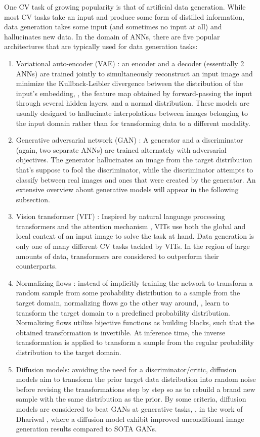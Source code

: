 One CV task of growing popularity is that of artificial data generation.
While most CV tasks take an input and produce some form of distilled information, data generation takes some input (and sometimes no input at all) and hallucinates new data.
In the domain of ANNs, there are five popular architectures that are typically used for data generation tasks:
\begin{enumerate}
    \item Variational auto-encoder (VAE) \cite{kingma2013auto}: an encoder and a decoder (essentially 2 ANNs) are trained jointly to simultaneously reconstruct an input image and minimize the Kullback-Leibler divergence \cite{csiszar1975divergence} between the distribution of the input's embedding, \ie, the feature map obtained by forward-passing the input through several hidden layers, and a normal distribution. 
    These models are usually designed to hallucinate interpolations between images belonging to the input domain rather than for transforming data to a different modality.
    \item Generative adversarial network (GAN) \cite{goodfellow2014generative}: A generator and a discriminator (again, two separate ANNs) are trained alternately with adversarial objectives. 
    The generator hallucinates an image from the target distribution that's suppose to fool the discriminator, while the discriminator attempts to classify between real images and ones that were created by the generator.
    An extensive overview about generative models will appear in the following subsection.
    \item Vision transformer (VIT) \cite{dosovitskiy2020image}: Inspired by natural language processing transformers and the attention mechanism \cite{vaswani2017attention}, VITs use both the global and local context of an input image to solve the task at hand.
    Data generation is only one of many different CV tasks tackled by VITs.
    In the region of large amounts of data, transformers are considered to outperform their counterparts.
    \item Normalizing flows \cite{rezende2015variational}: instead of implicitly training the network to transform a random sample from some probability distribution to a sample from the target domain, normalizing flows go the other way around, \ie, learn to transform the target domain to a predefined probability distribution.
    Normalizing flows utilize bijective functions as building blocks, such that the obtained transformation is invertible.
    At inference time, the inverse transformation is applied to transform a sample from the regular probability distribution to the target domain.
    \item Diffusion models\cite{sohl2015deep}: avoiding the need for a discriminator/critic, diffusion models aim to transform the prior target data distribution into random noise before revising the transformations step by step so as to rebuild a brand new sample with the same distribution as the prior.
    By some criteria, diffusion models are considered to beat GANs at generative tasks, \eg, in the work of Dhariwal \etal \cite{dhariwal2021diffusion}, where a diffusion model exhibit improved unconditional image generation results compared to SOTA GANs.


\end{enumerate}
